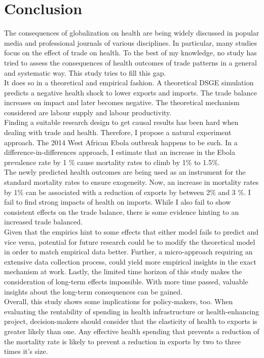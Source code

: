 \documentclass{article}
\begin{document}
\section{Conclusion}
The consequences of globalization on health are being widely discussed in popular media and professional journals of various disciplines. In particular, many studies focus on the effect of trade on health. To the best of my knowledge, no study has tried to assess the consequences of health outcomes of trade patterns in a general and systematic way. This study tries to fill this gap.\\
It does so in a theoretical and empirical fashion. A theoretical DSGE simulation predicts a negative health shock to lower exports and imports. The trade balance increases on impact and later becomes negative. The theoretical mechanism considered are labour supply and labour productivity.\\
Finding a suitable research design to get causal results has been hard when dealing with trade and health. Therefore, I propose a natural experiment approach. The 2014 West African Ebola outbreak happens to be such. In a difference-in-differences approach, I estimate that an increase in the Ebola prevalence rate by 1 \% cause mortality rates to climb by 1\% to 1.5\%. \\
The newly predicted health outcomes are being used as an instrument for the standard mortality rates to ensure exogeneity. Now, an increase in mortality rates by 1\% can be associated with a reduction of exports by between 2\% and 3 \%. I fail to find strong impacts of health on imports. While I also fail to show consistent effects on the trade balance, there is some evidence hinting to an increased trade balanced. \\
Given that the empirics hint to some effects that either model fails to predict and vice versa, potential for future research could be to modify the theoretical model in order to match empirical data better. Further, a micro-approach requiring an extensive data collection process, could yield more empirical insights in the exact mechanism at work. Lastly, the limited time horizon of this study makes the consideration of long-term effects impossible. With more time passed, valuable insights about the long-term consequences can be gained.\\
Overall, this study shows some implications for policy-makers, too. When evaluating the rentability of spending in health infrastructure or health-enhancing project, decision-makers should consider that the elasticity of health to exports is greater likely than one. Any effective health spending that prevents a reduction of the mortality rate is likely to prevent a reduction in exports by two to three times it's size.
\end{document}
